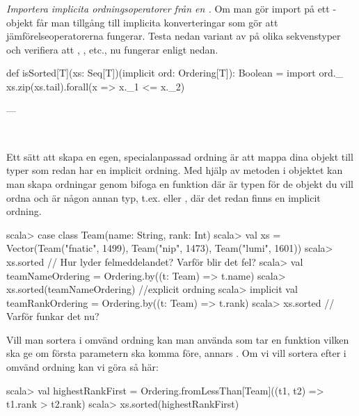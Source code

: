 \Subtask \emph{Importera implicita ordningsoperatorer från en .} Om man gör import på ett -objekt får man tillgång till implicita konverteringar som gör att jämförelseoperatorerna fungerar. Testa nedan variant av  på olika sekvenstyper och verifiera att \code{<=}, \code{>}, etc., nu fungerar enligt nedan.
\begin{CodeSmall}
def isSorted[T](xs: Seq[T])(implicit ord: Ordering[T]): Boolean = {
  import ord._
  xs.zip(xs.tail).forall(x => x._1 <= x._2)
}
\end{CodeSmall}


\SOLUTION


\TaskSolved \what ---

\QUESTEND







\QUESTBEGIN

\Task \label{task:custom-ordering} \what~

\Subtask Ett sätt att skapa en egen, specialanpassad ordning är att mappa dina objekt till typer som redan har en implicit ordning. Med hjälp av metoden  i objektet  kan man skapa ordningar genom bifoga en funktion  där  är typen för de objekt du vill ordna och  är någon annan typ, t.ex.  eller , där det redan finns en implicit ordning.
\begin{REPL}
scala> case class Team(name: String, rank: Int)
scala> val xs =
         Vector(Team("fnatic", 1499), Team("nip", 1473), Team("lumi", 1601))
scala> xs.sorted  // Hur lyder felmeddelandet? Varför blir det fel?
scala> val teamNameOrdering = Ordering.by((t: Team) => t.name)
scala> xs.sorted(teamNameOrdering)   //explicit ordning
scala> implicit val teamRankOrdering = Ordering.by((t: Team) => t.rank)
scala> xs.sorted   // Varför funkar det nu?
\end{REPL}

\Subtask Vill man sortera i omvänd ordning kan man använda
 som tar en funktion  vilken ska ge  om första parametern ska komma före, annars . Om vi vill sortera efter  i omvänd ordning kan vi göra så här:
\begin{REPL}
scala> val highestRankFirst =
         Ordering.fromLessThan[Team]((t1, t2) => t1.rank > t2.rank)
scala> xs.sorted(highestRankFirst)
\end{REPL}

